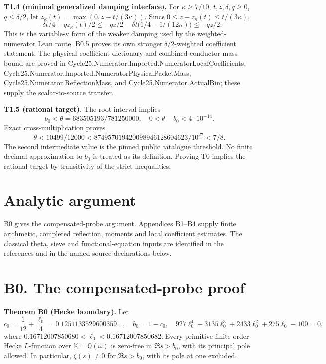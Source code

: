 \documentclass[11pt,a4paper]{article}
\newcommand{\sourcecode}[1]{{\small\ttfamily #1}}
\begin{document}
\textbf{T1.4 (minimal generalized damping interface).} For
\(\kappa\ge7/10\), \(t,\allowbreak{}z,\allowbreak{}\delta,\allowbreak{}q\ge0\), \(q\le\delta/2\), let
\(z_\kappa(t)=\max(0,\allowbreak{}z-t/(3\kappa))\). Since
\(0\le z-z_\kappa(t)\le t/(3\kappa)\), \[
-\delta t/4-qz_\kappa(t)/2
\le-qz/2-\delta t\bigl(1/4-1/(12\kappa)\bigr)\le-qz/2.
\] This is the variable-\(\kappa\) form of the weaker damping used by
the weighted-numerator Lean route. B0.5 proves its own stronger
\(\delta/2\)-weighted coefficient statement. The physical coefficient
dictionary and combined-conductor mass bound are proved in
\sourcecode{Cycle25.\allowbreak{}Numerator.\allowbreak{}Imported.\allowbreak{}Numerator\allowbreak{}Local\allowbreak{}Coefficients},
\sourcecode{Cycle25.\allowbreak{}Numerator.\allowbreak{}Imported.\allowbreak{}Numerator\allowbreak{}Physical\allowbreak{}Packet\allowbreak{}Mass},
\sourcecode{Cycle25.\allowbreak{}Numerator.\allowbreak{}Reflection\allowbreak{}Mass}, and
\sourcecode{Cycle25.\allowbreak{}Numerator.\allowbreak{}Actual\allowbreak{}Bin}; these supply the scalar-to-source
transfer.

\textbf{T1.5 (rational target).} The root interval implies \[
b_0<\theta=683505193/781250000,
\quad 0<\theta-b_0<4\cdot10^{-14}.
\] Exact cross-multiplication proves \[
\theta<10499/12000
<874957019420098946128604623/10^{27}<7/8.
\] The second intermediate value is the pinned public catalogue
threshold. No finite decimal approximation to \(b_0\) is treated as its
definition. Proving T0 implies the rational target by transitivity of
the strict inequalities.

\hypertarget{analytic-argument}{%
\section{Analytic argument}\label{analytic-argument}}

B0 gives the compensated-probe argument. Appendices B1--B4 supply finite
arithmetic, completed reflection, moments and local coefficient
estimates. The classical theta, sieve and functional-equation inputs are
identified in the references and in the named source declarations below.

\hypertarget{b0.-the-compensated-probe-proof}{%
\section{B0. The compensated-probe
proof}\label{b0.-the-compensated-probe-proof}}

\textbf{Theorem B0 (Hecke boundary).} Let \[
c_0=\frac1{12}+\frac{\ell_0}{4}=0.1251133529600359\ldots,
\quad b_0=1-c_0,
\quad927\ell_0^4-3135\ell_0^3+2433\ell_0^2+275\ell_0-100=0,
\tag{B0.1}
\] where \(0.16712007850680<\ell_0<0.16712007850682\). Every primitive
finite-order Hecke \(L\)-function over \(\mathbb K=\mathbb Q(\omega)\)
is zero-free in \(\Re s>b_0\), with its principal pole allowed. In
particular, \(\zeta(s)\ne0\) for \(\Re s>b_0\), with its pole at one
excluded.
\end{document}
